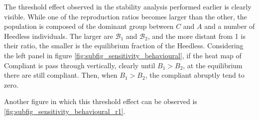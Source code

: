 The threshold effect observed in the stability analysis performed earlier is clearly visible. While one of the reproduction ratios becomes larger than the other, the population is composed of the dominant group between $C$ and $A$ and a number of Heedless individuals. The larger are $\mathcal{B}_1$ and $\mathcal{B}_2$, and the more distant from 1 is their ratio, the  smaller is the equilibrium fraction of the Heedless. Considering the left panel in figure \ref{fig:subfig_sensitivity_behavioural}, if the heat map of Compliant is pass through vertically, clearly until $B_1 > B_2$, at the equilibrium there are still compliant. Then, when $B_1 > B_2$, the compliant abruptly tend to zero. 

Another figure in which this threshold effect can be observed is \ref{fig:subfig_sensitivity_behavioural_r1}.

